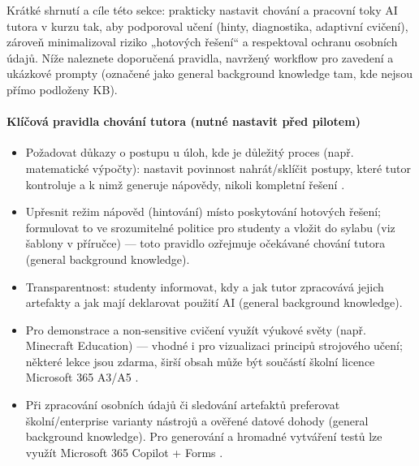 \begin{flushleft}
Krátké shrnutí a cíle této sekce: prakticky nastavit chování a pracovní toky AI tutora v kurzu tak, aby podporoval učení (hinty, diagnostika, adaptivní cvičení), zároveň minimalizoval riziko „hotových řešení“ a respektoval ochranu osobních údajů. Níže naleznete doporučená pravidla, navržený workflow pro zavedení a ukázkové prompty (označené jako general background knowledge tam, kde nejsou přímo podloženy KB).
\end{flushleft}

\paragraph{Klíčová pravidla chování tutora (nutné nastavit před pilotem)}
\begin{itemize}
  \item Požadovat důkazy o postupu u úloh, kde je důležitý proces (např. matematické výpočty): nastavit povinnost nahrát/sklíčit postupy, které tutor kontroluje a k nimž generuje nápovědy, nikoli kompletní řešení \cite{kb_ai_101_tipu_pdf_04e4a115_page_8_1}.
  \item Upřesnit režim nápověd (hintování) místo poskytování hotových řešení; formulovat to ve srozumitelné politice pro studenty a vložit do sylabu (viz šablony v příručce) — toto pravidlo ozřejmuje očekávané chování tutora (general background knowledge).
  \item Transparentnost: studenty informovat, kdy a jak tutor zpracovává jejich artefakty a jak mají deklarovat použití AI (general background knowledge).
  \item Pro demonstrace a non‑sensitive cvičení využít výukové světy (např. Minecraft Education) — vhodné i pro vizualizaci principů strojového učení; některé lekce jsou zdarma, širší obsah může být součástí školní licence Microsoft 365 A3/A5 \cite{kb_ai_101_tipu_pdf_04e4a115_page_15_2}.
  \item Při zpracování osobních údajů či sledování artefaktů preferovat školní/enterprise varianty nástrojů a ověřené datové dohody (general background knowledge). Pro generování a hromadné vytváření testů lze využít Microsoft 365 Copilot + Forms \cite{kb_ai_101_tipu_pdf_04e4a115_page_36_1}.
\end{itemize}

